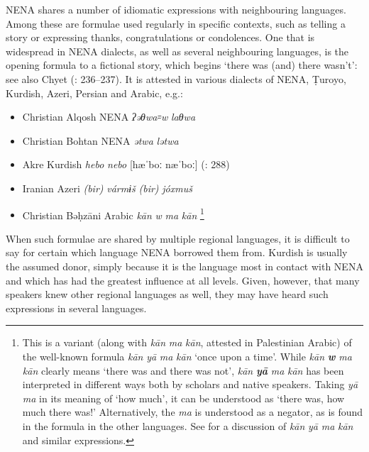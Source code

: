 \documentclass[output=paper]{langsci/langscibook}
\begin{document}
NENA shares a number of idiomatic expressions with neighbouring languages. Among these are formulae used regularly in specific contexts, such as telling a story or expressing thanks, congratulations or condolences. One that is widespread in NENA dialects, as well as several neighbouring languages, is the opening formula to a fictional story, which begins ‘there was (and) there wasn’t’: see also Chyet (\citeyear{Chyet1995}: 236–237). It is attested in various dialects of NENA, Ṭuroyo, Kurdish, Azeri, Persian and Arabic, e.g.:

\begin{itemize}[noitemsep]

\item[] Christian Alqosh NENA   \textit{ʔəθwa꞊w} \textit{laθwa} \citep[268]{Coghill2009}

\item[] Christian Bohtan NENA   \textit{ətwa} \textit{lətwa} \citep{Fox2009}

\item[] Akre Kurdish   \textit{hebo} \textit{nebo} [hæˈboː næˈboː] (\citealt{MacKenzie1962}: 288) 

\item[] Iranian Azeri   \textit{(bir)} \textit{vármɨš} \textit{(bir)} \textit{jóxmuš} \citep[175]{Garbell1965}

\item[] Christian Bəḥzāni Arabic   \textit{kān} \textit{w} \textit{ma} \textit{kān} \citep[404]{Jastrow1981}\footnote{This is a variant (along with \textit{kān} \textit{ma} \textit{kān}, attested in Palestinian Arabic) of the well-known formula \textit{kān} \textit{yā} \textit{ma} \textit{kān} ‘once upon a time’. While \textit{kān} \textbf{\textit{w}} \textit{ma} \textit{kān} clearly means ‘there was and there was not’, \textit{kān} \textbf{\textit{yā}} \textit{ma} \textit{kān} has been interpreted in different ways both by scholars and native speakers. Taking \textit{yā} \textit{ma} in its meaning of ‘how much’, it can be understood as ‘there was, how much there was!’ Alternatively, the \textit{ma} is understood as a negator, as is found in the formula in the other languages. See \citet{Lentin1995} for a discussion of \textit{kān} \textit{yā} \textit{ma} \textit{kān} and similar expressions.}
\end{itemize}

When such formulae are shared by multiple regional languages, it is difficult to say for certain which language NENA borrowed them from. Kurdish is usually the assumed donor, simply because it is the language most in contact with NENA and which has had the greatest influence at all levels. Given, however, that many speakers knew other regional languages as well, they may have heard such expressions in several languages.
\end{document}
